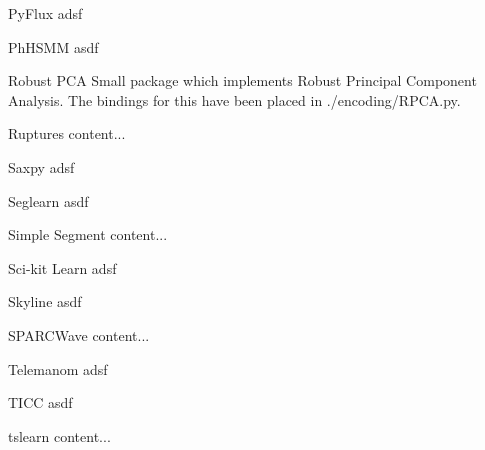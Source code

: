 \documentclass[10pt,a4paper]{report}
\begin{document}
\begin{section}{PyFlux}
	adsf	
\end{section}

\begin{section}{PhHSMM}
	asdf
\end{section}

\begin{section}{Robust PCA}
Small package which implements Robust Principal Component Analysis. The bindings for this have been placed in ./encoding/RPCA.py.
\end{section}


\begin{section}{Ruptures}
	content...
\end{section}

\begin{section}{Saxpy}
	adsf	
\end{section}

\begin{section}{Seglearn}
	asdf
\end{section}


\begin{section}{Simple Segment}
	content...
\end{section}

\begin{section}{Sci-kit Learn}
	adsf	
\end{section}

\begin{section}{Skyline}
	asdf
\end{section}


\begin{section}{SPARCWave}
	content...
\end{section}

\begin{section}{Telemanom}
	adsf	
\end{section}

\begin{section}{TICC}
	asdf
\end{section}

\begin{section}{tslearn}
	content...
\end{section}


	
	
\end{document}
